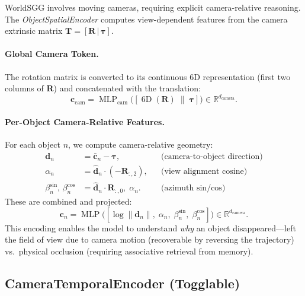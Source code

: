 \documentclass{article}
\newcommand{\mR}{\mathbb{R}}
\newcommand{\op}[1]{\operatorname{#1}}
\newcommand{\mat}[1]{\bm{#1}}
\begin{document}
WorldSGG involves moving cameras, requiring explicit camera-relative reasoning.  The \emph{ObjectSpatialEncoder} computes view-dependent features from the camera extrinsic matrix $\mat{T} = [\mat{R}\,|\,\boldsymbol{\tau}]$.

\paragraph{Global Camera Token.}  The rotation matrix is converted to its continuous 6D representation (first two columns of $\mat{R}$) and concatenated with the translation:
\begin{equation}
    \mat{c}_{\text{cam}} = \op{MLP}_{\text{cam}}\bigl([\op{6D}(\mat{R}) \;\|\; \boldsymbol{\tau}]\bigr) \in \mR^{d_{\text{camera}}}.
    \label{eq:cam_global}
\end{equation}

\paragraph{Per-Object Camera-Relative Features.}  For each object $n$, we compute camera-relative geometry:
\begin{align}
    \mat{d}_n &= \bar{\mat{c}}_n - \boldsymbol{\tau}, & &\text{(camera-to-object direction)} \label{eq:cam_dir} \\
    \alpha_n &= \hat{\mat{d}}_n \cdot (-\mat{R}_{:,2}), & &\text{(view alignment cosine)} \label{eq:view_align} \\
    \beta_n^{\sin},\,\beta_n^{\cos} &= \hat{\mat{d}}_n \cdot \mat{R}_{:,0},\; \alpha_n. & &\text{(azimuth sin/cos)} \label{eq:azimuth}
\end{align}
These are combined and projected:
\begin{equation}
    \mat{c}_n = \op{MLP}\bigl([\log\|\mat{d}_n\|,\;\alpha_n,\;\beta_n^{\sin},\;\beta_n^{\cos}]\bigr) \in \mR^{d_{\text{camera}}}.
    \label{eq:cam_per_obj}
\end{equation}
This encoding enables the model to understand \emph{why} an object disappeared---left the field of view due to camera motion (recoverable by reversing the trajectory) vs.\ physical occlusion (requiring associative retrieval from memory).

\subsection{CameraTemporalEncoder (Togglable)}
\end{document}
